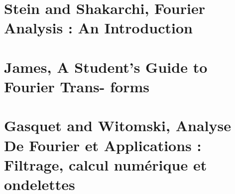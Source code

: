 \section{Stein and Shakarchi, Fourier Analysis : An Introduction}
\label{sec:Stein and Shakarchi, Fourier Analysis : An Introduction}
\section{James, A Student’s Guide to Fourier Trans-
forms }
\section{Gasquet and Witomski, Analyse De Fourier
et Applications : Filtrage, calcul numérique
et ondelettes}
























